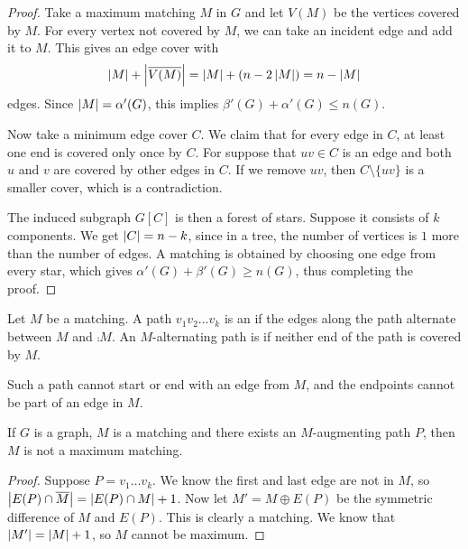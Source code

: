\begin{proof}
  Take a maximum matching $M$ in $G$ and let $V(M)$ be the vertices covered by
  $M$.
  For every vertex not covered by $M$, we can take an incident edge and add it
  to $M$.
  This gives an edge cover with
  \[
	\left| M \right| + \left| \overline{V(M)} \right| = \left| M \right| + (n - 2 \left| M \right|) = n - \left| M \right|
  \]
  edges.
  Since $\left| M \right| = \alpha'(G)$, this implies $\beta'(G) + \alpha'(G) \le n(G)$.

  Now take a minimum edge cover $C$.
  We claim that for every edge in $C$, at least one end is covered only once by
  $C$.
  For suppose that $uv \in C$ is an edge and both $u$ and $v$ are covered by
  other edges in $C$.
  If we remove $uv$, then $C \setminus \{uv\}$ is a smaller cover, which is a
  contradiction.

  The induced subgraph $G[C]$ is then a forest of stars.
  Suppose it consists of $k$ components.
  We get $\left| C \right| = n-k$, since in a tree, the number of vertices is $1$ more
  than the number of edges.
  A matching is obtained by choosing one edge from every star, which gives
  $\alpha'(G) + \beta'(G) \ge n(G)$, thus completing the proof.
\end{proof}


\begin{definition}
  Let $M$ be a matching.
  A path $v_1 v_2 \ldots v_k$ is an  if
  the edges along the path alternate between $M$ and $\comp{M}$.
  An $M$-alternating path is  if neither end of the path
  is covered by $M$.
\end{definition}

\begin{remark}
  Such a path cannot start or end with an edge from $M$, and the endpoints
  cannot be part of an edge in $M$.
\end{remark}

\begin{proposition}
  If $G$ is a graph, $M$ is a matching and there exists an $M$-augmenting path
  $P$, then $M$ is not a maximum matching.
\end{proposition}

\begin{proof}
  Suppose $P = v_1 \ldots v_k$.
  We know the first and last edge are not in $M$, so $\left| E(P) \cap \overline{M} \right| =
  \left| E(P) \cap M \right| + 1$.
  Now let $M' = M \oplus E(P)$ be the symmetric difference of $M$ and $E(P)$.
  This is clearly a matching.
  We know that $\left| M' \right| = \left| M \right| + 1$, so $M$ cannot be maximum.
\end{proof}

